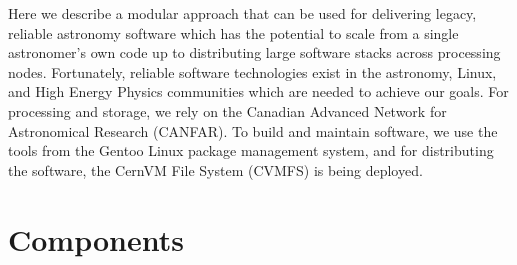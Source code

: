 Here we describe a modular approach that can be used for delivering legacy, reliable astronomy software which has the potential to scale from a single astronomer's own code up to distributing large software stacks across processing nodes. Fortunately, reliable software technologies exist in the astronomy, Linux, and High Energy Physics communities which are needed to achieve our goals. For processing and storage, we rely on the Canadian Advanced Network for Astronomical Research (CANFAR). To build and maintain software, we use the tools from the Gentoo Linux package management system, and for distributing the software, the CernVM File System (CVMFS) is being deployed.

\section{Components}
